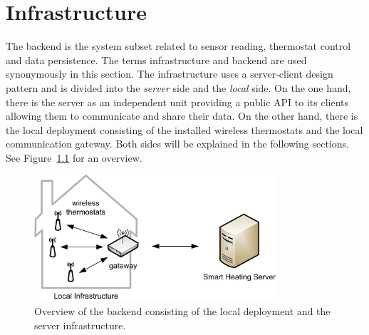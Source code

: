 
\chapter{Infrastructure}
\label{sec:infrastructure}




The backend is the system subset related to sensor reading, thermostat control and data persistence.
The terms infrastructure and backend are used synonymously in this section.
The infrastructure uses a server-client design pattern and is divided into the \emph{server} side and the \emph{local} side.
On the one hand, there is the server as an independent unit providing a public API to its clients allowing them to communicate and share their data.
On the other hand, there is the local deployment consisting of the installed wireless thermostats and the local communication gateway.
Both sides will be explained in the following sections.
See Figure~\ref{fig:backend} for an overview.

\begin{figure}[h]
	\begin{center}
		\includegraphics[width=0.8\textwidth]{images/Backend.png}
	\end{center}
	\caption{Overview of the backend consisting of the local deployment and the server infrastructure.}
	\label{fig:backend}
\end{figure}
